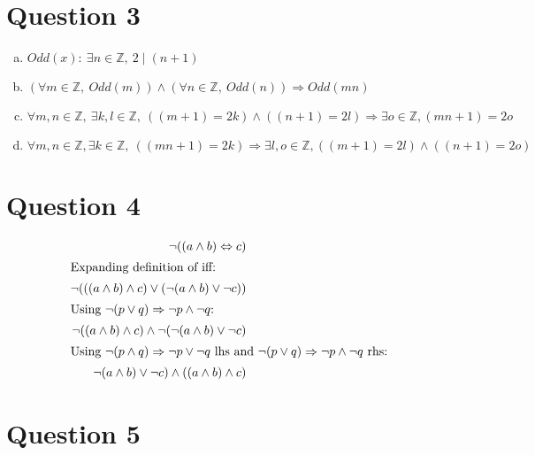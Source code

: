 \documentclass[12pt]{article}
\begin{document}
\section*{Question 3}

\begin{enumerate}[a)]
    \item
        $Odd(x):\: \exists n \in \mathbb{Z},\: 2 \mid (n+1)$
    \item
        $(\forall m \in \mathbb{Z},\:Odd(m))\land(\forall n \in \mathbb{Z},\:Odd(n)) \Rightarrow Odd(mn)$
    \item
        $\forall m,n \in \mathbb{Z},\:\exists k,l \in \mathbb{Z},\:((m+1)=2k)\land((n+1)=2l) \Rightarrow \exists o \in \mathbb{Z}, (mn+1)=2o$
    \item
        $\forall m,n \in \mathbb{Z}, \exists k \in \mathbb{Z},\:((mn+1)=2k) \Rightarrow \exists l,o \in \mathbb{Z}, ((m+1)=2l)\land((n+1)=2o)$

\end{enumerate}


\section*{Question 4}
    \begin{align}
        \neg ((a \land b) \Leftrightarrow c) \\
        \shortintertext{Expanding definition of iff:}
        \neg (((a\land b) \land c) \lor (\neg (a \land b) \lor \neg c)) \\
        \shortintertext{Using $\neg(p \lor q) \Rightarrow \neg p \land \neg q$:}
        \neg((a\land b) \land c) \land \neg (\neg (a \land b) \lor \neg c) \\
        \shortintertext{Using $\neg(p \land q) \Rightarrow \neg p \lor \neg q$ lhs and $\neg(p \lor q) \Rightarrow \neg p \land \neg q$ rhs:}
        \neg(a\land b) \lor \neg c) \land ((a \land b) \land c)\\
    \end{align}

\section*{Question 5}
\end{document}
